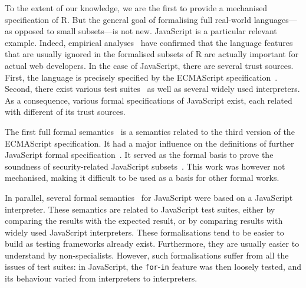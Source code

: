 \documentclass[
    sigplan,
    10pt,
    review, %
    natbib=false %
 ]{acmart}
\begin{document}
To the extent of our knowledge,
we are the first to provide a mechanised specification of R.
But the general goal of formalising full real-world languages—%
as opposed to small subsets—is not new.
%
JavaScript is a particular relevant example.
Indeed, empirical analyses~\parencite{RichardsHBV11}
have confirmed that the language features
that are usually ignored in the formalised subsets of R
are actually important for actual web developers.
%
In the case of JavaScript, there are several trust sources.
First, the language is precisely specified by the ECMAScript specification~\parencite{es2019}.
Second, there exist various test suites~\parencite{test262, mozillatests}
as well as several widely used interpreters.
As a consequence, various formal specifications of JavaScript exist,
each related with different of its trust sources.

The first full formal semantics~\parencite{aplas08}
is a semantics related to the third version of the ECMAScript specification.
It had a major influence on the definitions of further JavaScript formal
specification~\parencite{ses, jscert, popl12-Towards, usenix}.
It served as the formal basis to prove the soundness of security-related
JavaScript subsets~\parencite{MMT-CSF-TR09, mmt-esorics09, mmt-oakland10}.
This work was however not mechanised, making it difficult to be used
as a basis for other formal works.

In parallel, several formal semantics~\parencite{js-ml, Guha2010, Politz:S5, kjs}
for JavaScript were based on a JavaScript interpreter.
These semantics are related to JavaScript test suites,
either by comparing the results with the expected result,
or by comparing results with widely used JavaScript interpreters.
These formalisations tend to be easier to build
as testing frameworks already exist.
Furthermore, they are usually easier to understand by non-specialists.
However, such formalisations suffer from all the issues of test suites:
in JavaScript, the \texttt{for}-\texttt{in}
feature was then loosely tested,
and its behaviour varied from interpreters to interpreters.
\end{document}
